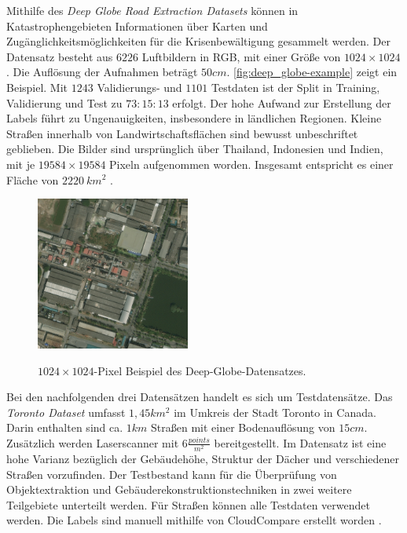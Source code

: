 Mithilfe des \textit{Deep Globe Road Extraction Datasets} können in Katastrophengebieten Informationen über Karten und Zugänglichkeitsmöglichkeiten für die Krisenbewältigung gesammelt werden.
Der Datensatz besteht aus $6226$ Luftbildern in RGB, mit einer Größe von $1024{\times}1024$.
Die Auflösung der Aufnahmen beträgt $50 cm$. \autoref{fig:deep_globe-example} zeigt ein Beispiel.
Mit $1243$ Validierungs- und $1101$ Testdaten ist der Split in Training, Validierung und Test zu $73:15:13$ erfolgt.
Der hohe Aufwand zur Erstellung der Labels führt zu Ungenauigkeiten, insbesondere in ländlichen Regionen. 
Kleine Straßen innerhalb von Landwirtschaftsflächen sind bewusst unbeschriftet geblieben.
Die Bilder sind ursprünglich über Thailand, Indonesien und Indien, mit je $19584{\times}19584$ Pixeln aufgenommen worden.
Insgesamt entspricht es einer Fläche von $2220~km^2$ \cite{Ashwath.10.11.2020}.

\begin{figure}
	\centering
	\vspace{-0pt} %
	\includegraphics[width=0.45\textwidth]{Bilder/deep_globe_example.jpg}
	\vspace{-5pt}
	\caption[$1024{\times}1024$-Pixel Beispiel des Deep-Globe-Datensatzes.]{\unskip}
	$1024{\times}1024$-Pixel Beispiel des Deep-Globe-Datensatzes.
	\label{fig:deep_globe-example}
\end{figure}

Bei den nachfolgenden drei Datensätzen handelt es sich um Testdatensätze.
Das \textit{Toronto Dataset} umfasst $1,45km^2$ im Umkreis der Stadt Toronto in Canada. 
Darin enthalten sind ca. $1 km$ Straßen mit einer Bodenauflösung von $15cm$. 
Zusätzlich werden Laserscanner mit $6 \frac{points}{m^2}$ bereitgestellt.
Im Datensatz ist eine hohe Varianz bezüglich der Gebäudehöhe, Struktur der Dächer und verschiedener Straßen vorzufinden.
Der Testbestand kann für die Überprüfung von Objektextraktion und Gebäuderekonstruktionstechniken in zwei weitere Teilgebiete unterteilt werden.
Für Straßen können alle Testdaten verwendet werden.
Die Labels sind manuell mithilfe von CloudCompare erstellt worden \cite{Englich.06.10.2022b,Tan.2020}.


